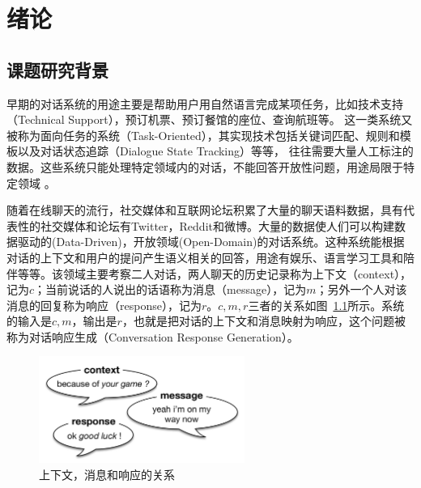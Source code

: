 
\chapter{绪论}\label{ch:introduction}

\section{课题研究背景}\label{sec:research_background}
早期的对话系统的用途主要是帮助用户用自然语言完成某项任务，比如技术支持（Technical Support），预订机票、预订餐馆的座位、查询航班等。
这一类系统又被称为面向任务的系统（Task-Oriented），其实现技术包括关键词匹配、规则和模板以及对话状态追踪（Dialogue State Tracking）等等，
往往需要大量人工标注的数据。这些系统只能处理特定领域内的对话，不能回答开放性问题，用途局限于特定领域
。

随着在线聊天的流行，社交媒体和互联网论坛积累了大量的聊天语料数据，具有代表性的社交媒体和论坛有Twitter，Reddit和微博。大量的数据使人们可以构建数据驱动的(Data-Driven)，开放领域(Open-Domain)的对话系统。这种系统能根据对话的上下文和用户的提问产生语义相关的回答，用途有娱乐、语言学习工具和陪伴等等。该领域主要考察二人对话，两人聊天的历史记录称为上下文（context），记为$c$；当前说话的人说出的话语称为消息（message），记为$m$；另外一个人对该消息的回复称为响应（response），记为$r$。$c,m,r$三者的关系如图~\ref{fig:context_message_response}所示。系统的输入是$c,m$，输出是$r$，也就是把对话的上下文和消息映射为响应，这个问题被称为对话响应生成（Conversation Response Generation）。

\begin{figure}[H]
    \includegraphics[width=0.6\textwidth]{figure/context_message_response.png}
    \centering
    \caption{上下文，消息和响应的关系}
    \label{fig:context_message_response}
\end{figure}

